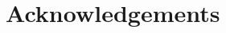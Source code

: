 \documentclass[openacc]{rsproca_new}
\begin{document}
\section{Acknowledgements}
\printbibliography
\newpage
\clearpage


\end{document}
